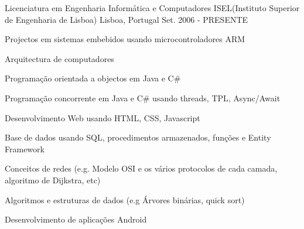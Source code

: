 


\begin{cventries}


\cventry
{Licenciatura em Engenharia Informática e Computadores} %
{ISEL(Instituto Superior de Engenharia de Lisboa)} %
{Lisboa, Portugal} %
{Set. 2006 - PRESENTE} %
{ %
\begin{cvitems}
\item {Projectos em sistemas embebidos usando microcontroladores ARM}
\item {Arquitectura de computadores}
\item {Programação orientada a objectos em Java e C\#}
\item {Programação concorrente em Java e C\# usando threads, TPL, Async/Await}
\item {Desenvolvimento Web usando HTML, CSS, Javascript}
\item {Base de dados usando SQL, procedimentos armazenados, funções e Entity Framework}
\item {Conceitos de redes (e.g. Modelo OSI e os vários protocolos de cada camada, algoritmo de Dijkstra, etc)}
\item {Algoritmos e estruturas de dados (e.g Árvores binárias, quick sort)}
\item {Desenvolvimento de aplicações Android}
\end{cvitems}
}


\end{cventries}